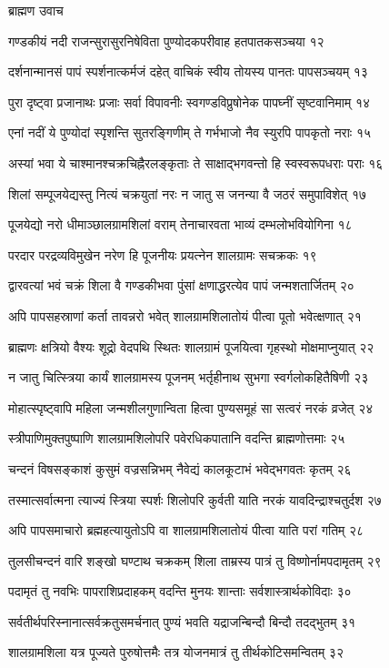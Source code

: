 ब्राह्मण उवाच

गण्डकीयं नदी राजन्सुरासुरनिषेविता
पुण्योदकपरीवाह हतपातकसञ्चया १२

दर्शनान्मानसं पापं स्पर्शनात्कर्मजं दहेत्
वाचिकं स्वीय तोयस्य पानतः पापसञ्चयम् १३

पुरा दृष्ट्वा प्रजानाथः प्रजाः सर्वा विपावनीः
स्वगण्डविप्रुषोनेक पापघ्नीं सृष्टवानिमाम् १४

एनां नदीं ये पुण्योदां स्पृशन्ति सुतरङ्गिणीम्
ते गर्भभाजो नैव स्युरपि पापकृतो नराः १५

अस्यां भवा ये चाश्मानश्चक्रचिह्नैरलङ्कृताः
ते साक्षाद्भगवन्तो हि स्वस्वरूपधराः पराः १६

शिलां सम्पूजयेद्यस्तु नित्यं चक्रयुतां नरः
न जातु स जनन्या वै जठरं समुपाविशेत् १७

पूजयेद्यो नरो धीमाञ्छालग्रामशिलां वराम्
तेनाचारवता भाव्यं दम्भलोभवियोगिना १८

परदार परद्रव्यविमुखेन नरेण हि
पूजनीयः प्रयत्नेन शालग्रामः सचक्रकः १९

द्वारवत्यां भवं चक्रं शिला वै गण्डकीभवा
पुंसां क्षणाद्धरत्येव पापं जन्मशतार्जितम् २०

अपि पापसहस्राणां कर्ता तावन्नरो भवेत्
शालग्रामशिलातोयं पीत्वा पूतो भवेत्क्षणात् २१

ब्राह्मणः क्षत्रियो वैश्यः शूद्रो वेदपथि स्थितः
शालग्रामं पूजयित्वा गृहस्थो मोक्षमाप्नुयात् २२

न जातु चित्स्त्रिया कार्यं शालग्रामस्य पूजनम्
भर्तृहीनाथ सुभगा स्वर्गलोकहितैषिणी २३

मोहात्स्पृष्ट्वापि महिला जन्मशीलगुणान्विता
हित्वा पुण्यसमूहं सा सत्वरं नरकं व्रजेत् २४

स्त्रीपाणिमुक्तपुष्पाणि शालग्रामशिलोपरि
पवेरधिकपातानि वदन्ति ब्राह्मणोत्तमाः २५

चन्दनं विषसङ्काशं कुसुमं वज्रसन्निभम्
नैवेद्यं कालकूटाभं भवेद्भगवतः कृतम् २६

तस्मात्सर्वात्मना त्याज्यं स्त्रिया स्पर्शः शिलोपरि
कुर्वती याति नरकं यावदिन्द्राश्चतुर्दश २७

अपि पापसमाचारो ब्रह्महत्यायुतोऽपि वा
शालग्रामशिलातोयं पीत्वा याति परां गतिम् २८

तुलसीचन्दनं वारि शङ्खो घण्टाथ चक्रकम्
शिला ताम्रस्य पात्रं तु विष्णोर्नामपदामृतम् २९

पदामृतं तु नवभिः पापराशिप्रदाहकम्
वदन्ति मुनयः शान्ताः सर्वशास्त्रार्थकोविदाः ३०

सर्वतीर्थपरिस्नानात्सर्वक्रतुसमर्चनात्
पुण्यं भवति यद्राजन्बिन्दौ बिन्दौ तदद्भुतम् ३१

शालग्रामशिला यत्र पूज्यते पुरुषोत्तमैः
तत्र योजनमात्रं तु तीर्थकोटिसमन्वितम् ३२

